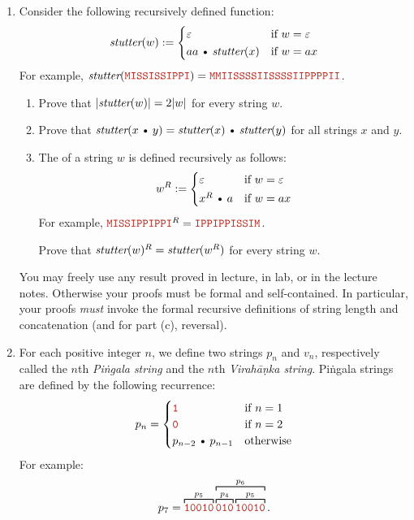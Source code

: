 \documentclass[11pt]{article}
\def\Cdot{\mathbin{\text{\normalfont \textbullet}}}
\def\Sym#1{\texttt{\color{BrickRed}#1}}
\begin{document}
\begin{enumerate}

\item
Consider the following recursively defined function:
\[
	\emph{stutter}(w) := \begin{cases}
		\e & \text{if $w=\e$}\\[0.25ex]
		aa\Cdot \emph{stutter}(x) & \text{if $w = ax$}
	\end{cases}
\]
For example, $\emph{stutter}(\Sym{MISSISSIPPI}) = \Sym{MMIISSSSIISSSSIIPPPPII}$.
\begin{enumerate}
\item
Prove that $\mathopen| \emph{stutter}(w) \mathclose| = 2\mathopen| w \mathclose|$ for every string $w$.

\item
Prove that $\emph{stutter}(x\Cdot y) = \emph{stutter}(x)\Cdot \emph{stutter}(y)$ for all strings $x$ and $y$.

\item
\textcolor{PineGreen}{}

The  of a string $w$ is defined recursively as follows:
\[	
	w^R := \begin{cases}
		\e & \text{if $w=\e$} \\[0.5ex]
		x^R \Cdot a & \text{if $w=ax$}
	\end{cases}
\]
For example, $\Sym{MISSIPPIPPI}^R = \Sym{IPPIPPISSIM}$.

Prove that $\emph{stutter}(w)^R = \emph{stutter}(w^R)$ for every string $w$.

\end{enumerate}

You may freely use any result proved in lecture, in lab, or in the lecture notes.  Otherwise your proofs must be formal and self-contained.  In particular, your proofs \emph{must} invoke the formal recursive definitions of string length and concatenation \textcolor{PineGreen}{(and for part (c), reversal)}.

\newpage
\item
For each positive integer $n$, we define two strings $p_n$ and $v_n$, respectively called the $n$th \emph{Piṅgala string} and the $n$th \emph{Virahāṇka string}.  Piṅgala strings are defined by the following recurrence:
\[
	p_n = \begin{cases}
		\Sym1 & \text{if $n=1$} \\
		\Sym0 & \text{if $n=2$} \\
		p_{n-2}\Cdot p_{n-1} & \text{otherwise}
	\end{cases}
\]
For example:
\[
	p_7
	= \overbracket[0.75pt]{\Sym{10010}}^{p_5}
		\overbracket[0.75pt]{
			\overbracket[0.75pt]{\Sym{010}}^{p_4}
			\overbracket[0.75pt]{\Sym{10010}}^{p_5}
		}^{p_6}.
\]


\end{enumerate}
\end{document}

